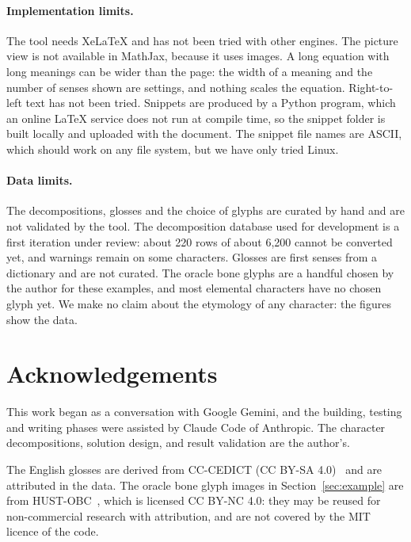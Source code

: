\documentclass[11pt]{article}
\begin{document}
\paragraph{Implementation limits.} The tool needs XeLaTeX and has not been tried with other engines. The picture view is not available in MathJax,
because it uses images. A long equation with long meanings can be wider than the page: the width of a meaning and the number of senses shown are
settings, and nothing scales the equation. Right-to-left text has not been tried. Snippets are produced by a Python program, which an online
\LaTeX{} service does not run at compile time, so the snippet folder is built locally and uploaded with the document. The snippet file names are ASCII,
which should work on any file system, but we have only tried Linux.

\paragraph{Data limits.} The decompositions, glosses and the choice of glyphs are curated by hand and are not validated by the tool. The decomposition
database used for development is a first iteration under review: about 220 rows of about 6,200 cannot be converted yet, and warnings remain on some
characters. Glosses are first senses from a dictionary and are not curated. The oracle bone glyphs are a handful chosen by the author for these
examples, and most elemental characters have no chosen glyph yet. We make no claim about the etymology of any character: the figures show the data.

\section*{Acknowledgements}
This work began as a conversation with Google Gemini, and the building, testing and writing phases were assisted by Claude Code of Anthropic. The character decompositions, solution design, and result validation are the author's.

The English glosses are derived from CC-CEDICT (CC BY-SA 4.0)~\cite{cedict} and are attributed in the data. The oracle bone glyph images in
Section~\ref{sec:example} are from HUST-OBC~\cite{hustobc}, which is licensed CC BY-NC 4.0: they may be reused for non-commercial research with
attribution, and are not covered by the MIT licence of the code.
\end{document}
